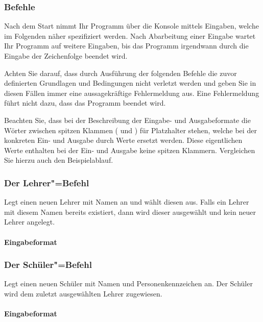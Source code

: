 \documentclass{sdqassignment}
\begin{document}
\subsubsection{Befehle}
Nach dem Start nimmt Ihr Programm über die Konsole mittels  Eingaben, welche im Folgenden näher spezifiziert werden. Nach Abarbeitung einer Eingabe wartet Ihr Programm auf weitere Eingaben, bis das Programm irgendwann durch die Eingabe der Zeichenfolge  beendet wird.

Achten Sie darauf, dass durch Ausführung der folgenden Befehle die zuvor definierten Grundlagen und Bedingungen nicht verletzt werden und geben Sie in diesen Fällen immer eine aussagekräftige Fehlermeldung aus. Eine Fehlermeldung führt nicht dazu, dass das Programm beendet wird.

Beachten Sie, dass bei der Beschreibung der Eingabe- und Ausgabeformate die Wörter zwischen spitzen Klammen (\lstinlinetxt{<} und \lstinlinetxt{>}) für Platzhalter stehen, welche bei der konkreten Ein- und Ausgabe durch Werte ersetzt werden. Diese eigentlichen Werte enthalten bei der Ein- und Ausgabe keine spitzen Klammern. Vergleichen Sie hierzu auch den Beispielablauf.

\subsubsection{Der Lehrer"=Befehl}
Legt einen neuen Lehrer mit Namen  an und wählt diesen aus. Falls ein Lehrer mit diesem Namen bereits existiert, dann wird dieser ausgewählt und kein neuer Lehrer angelegt.
\paragraph{Eingabeformat}

\subsubsection{Der Schüler"=Befehl}
Legt einen neuen Schüler mit Namen  und Personenkennzeichen  an. Der Schüler wird dem zuletzt ausgewählten Lehrer zugewiesen.
\paragraph{Eingabeformat}
\end{document}
